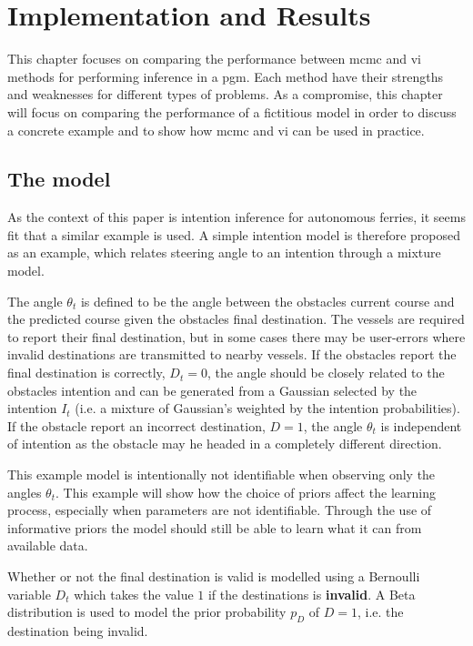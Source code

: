 \chapter{Implementation and Results}

This chapter focuses on comparing the performance between \acrshort{mcmc} and \acrshort{vi} methods for performing inference in a \acrshort{pgm}. Each method have their strengths and weaknesses for different types of problems. As a compromise, this chapter will focus on comparing the performance of a fictitious model in order to discuss a concrete example and to show how \acrshort{mcmc} and \acrshort{vi} can be used in practice.  

\section{The model}
As the context of this paper is intention inference for autonomous ferries, it seems fit that a similar example is used. A simple intention model is therefore proposed as an example, which relates steering angle to an intention through a mixture model. 

The angle $\theta_t$ is defined to be the angle between the obstacles current course and the predicted course given the obstacles final destination. The vessels are required to report their final destination, but in some cases there may be user-errors where invalid destinations are transmitted to nearby vessels. If the obstacles report the final destination is correctly, $D_t=0$, the angle should be closely related to the obstacles intention and can be generated from a Gaussian selected by the intention $I_t$ (i.e. a mixture of Gaussian's weighted by the intention probabilities). If the obstacle report an incorrect destination, $D=1$, the angle $\theta_t$ is independent of intention as the obstacle may he headed in a completely different direction.

This example model is intentionally not identifiable when observing only the angles $\theta_t$. This example will show how the choice of priors affect the learning process, especially when parameters are not identifiable. Through the use of informative priors the model should still be able to learn what it can from available data.   

Whether or not the final destination is valid is modelled using a Bernoulli variable $D_t$ which takes the value $1$ if the destinations is \textbf{invalid}. A Beta distribution is used to model the prior probability $p_D$ of $D=1$, i.e. the destination being invalid.  

